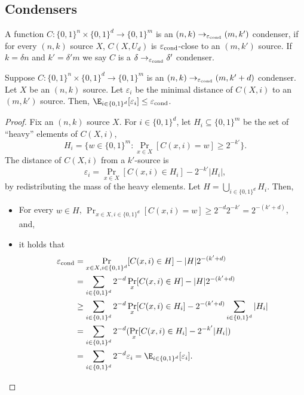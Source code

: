 \subsection*{Condensers}
\begin{definition}[condenser]
A function $C:\{0,1\}^n\times\{0,1\}^d\to\{0,1\}^m$ is an $(n,k)\to_{\varepsilon_{\rm cond}}(m,k')$ condenser, if for every $(n,k)$ source $X$, $C(X,U_d)$ is $\varepsilon_{\rm cond}$-close to an $(m,k')$ source. If $k=\delta n$ and $k'=\delta'm$ we say $C$ is a $\delta\to_{\varepsilon_{\rm cond}}\delta'$ condenser.
\end{definition}
\begin{lemma}
Suppose $C:\{0,1\}^n\times\{0,1\}^d\to\{0,1\}^m$ is an $(n,k)\to_{\varepsilon_{\rm cond}}(m,k'+d)$ condenser. Let $X$ be an $(n,k)$ source. Let $\varepsilon_i$ be the minimal distance of $C(X,i)$ to an $(m,k')$ source. Then, $\E_{i\in\{0,1\}^d}[\varepsilon_i]\le\varepsilon_{\rm cond}$.
\end{lemma}
\begin{proof}
Fix an $(n,k)$ source $X$. For $i\in\{0,1\}^d$, let $H_i\subseteq\{0,1\}^m$ be the set of ``heavy'' elements of $C(X,i)$,
\[H_i=\{w\in\{0,1\}^m:\Pr_{x\in X}[C(x,i)=w]\ge2^{-k'}\}.\]
The distance of $C(X,i)$ from a $k'$-source is
\[\varepsilon_i=\Pr_{x\in X}[C(x,i)\in H_i]-2^{-k'}|H_i|,\]
by redistributing the mass of the heavy elements. Let $H=\bigcup_{i\in\{0,1\}^d}H_i$. Then,
\begin{itemize}
\item For every $w\in H$, $\Pr_{x\in X,i\in\{0,1\}^d}[C(x,i)=w]\ge2^{-d}2^{-k'}=2^{-(k'+d)}$, and,
\item it holds that
\begin{align*}
\varepsilon_{\rm cond}&=\Pr_{x\in X,i\in\{0,1\}^d}[C(x,i)\in H]-|H|2^{-(k'+d)}\\
&=\sum_{i\in\{0,1\}^d}2^{-d}\Pr_x[C(x,i)\in H]-|H|2^{-(k'+d)}\\
&\ge\sum_{i\in\{0,1\}^d}2^{-d}\Pr_x[C(x,i)\in H_i]-2^{-(k'+d)}\sum_{i\in\{0,1\}^d}|H_i|\\
&=\sum_{i\in\{0,1\}^d}2^{-d}(\Pr_x[C(x,i)\in H_i]-2^{-k'}|H_i|)\\
&=\sum_{i\in\{0,1\}^d}2^{-d}\varepsilon_i=\E_{i\in\{0,1\}^d}[\varepsilon_i].
\end{align*}
\end{itemize}
\end{proof}
